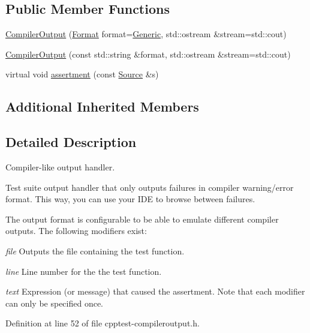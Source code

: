 \subsection*{Public Member Functions}
\begin{DoxyCompactItemize}
\item 
\mbox{\hyperlink{class_test_1_1_compiler_output_a816ae9a0ff2fb6cbb95c7cd815a6e621}{Compiler\+Output}} (\mbox{\hyperlink{class_test_1_1_compiler_output_ab34cf506804cefbc67545a256af196ff}{Format}} format=\mbox{\hyperlink{class_test_1_1_compiler_output_ab34cf506804cefbc67545a256af196ffa1a83926858dfb1bab06bc0a313a49dac}{Generic}}, std\+::ostream \&stream=std\+::cout)
\item 
\mbox{\hyperlink{class_test_1_1_compiler_output_a49f7092d23ce60e3b83fa30fb5ab9ab7}{Compiler\+Output}} (const std\+::string \&format, std\+::ostream \&stream=std\+::cout)
\item 
virtual void \mbox{\hyperlink{class_test_1_1_compiler_output_a1c36e3fd12afe3556e887349b0b86b50}{assertment}} (const \mbox{\hyperlink{class_test_1_1_source}{Source}} \&s)
\end{DoxyCompactItemize}
\subsection*{Additional Inherited Members}


\subsection{Detailed Description}
Compiler-\/like output handler. 

Test suite output handler that only outputs failures in compiler warning/error format. This way, you can use your I\+DE to browse between failures.

The output format is configurable to be able to emulate different compiler outputs. The following modifiers exist\+:
\begin{DoxyItemize}
\item {\itshape file} Outputs the file containing the test function.
\item {\itshape line} Line number for the the test function.
\item {\itshape text} Expression (or message) that caused the assertment. Note that each modifier can only be specified once. 
\end{DoxyItemize}

Definition at line 52 of file cpptest-\/compileroutput.\+h.



